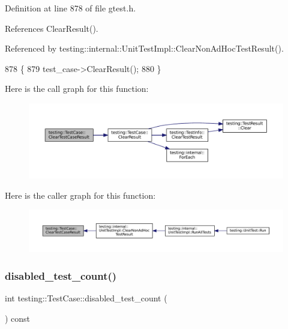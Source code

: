 Definition at line 878 of file gtest.\+h.



References Clear\+Result().



Referenced by testing\+::internal\+::\+Unit\+Test\+Impl\+::\+Clear\+Non\+Ad\+Hoc\+Test\+Result().


\begin{DoxyCode}
878                                                        \{
879     test\_case->ClearResult();
880   \}
\end{DoxyCode}
Here is the call graph for this function\+:
\nopagebreak
\begin{figure}[H]
\begin{center}
\leavevmode
\includegraphics[width=350pt]{classtesting_1_1TestCase_a1c05fe33863b79b1b1ed19e665a1cea7_cgraph}
\end{center}
\end{figure}
Here is the caller graph for this function\+:
\nopagebreak
\begin{figure}[H]
\begin{center}
\leavevmode
\includegraphics[width=350pt]{classtesting_1_1TestCase_a1c05fe33863b79b1b1ed19e665a1cea7_icgraph}
\end{center}
\end{figure}
\mbox{\label{classtesting_1_1TestCase_a8ef690ab8ec74d02c99416637de71ae8}} 
\subsubsection{\texorpdfstring{disabled\+\_\+test\+\_\+count()}{disabled\_test\_count()}}
{\footnotesize\ttfamily int testing\+::\+Test\+Case\+::disabled\+\_\+test\+\_\+count (\begin{DoxyParamCaption}{ }\end{DoxyParamCaption}) const}



